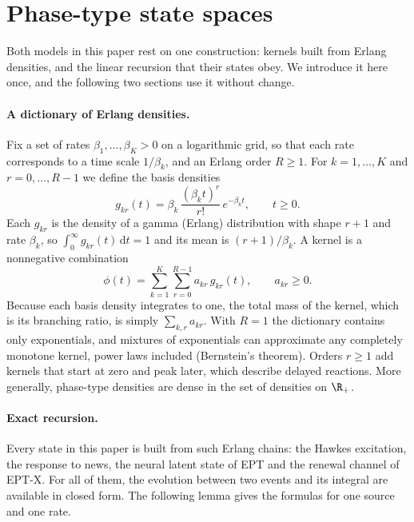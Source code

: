 \section{Phase-type state spaces}\label{sec:phasetype}

Both models in this paper rest on one construction: kernels built from Erlang densities, and the
linear recursion that their states obey. We introduce it here once, and the following two sections
use it without change.

\paragraph{A dictionary of Erlang densities.} Fix a set of rates $\beta_1,\dots,\beta_K>0$ on a
logarithmic grid, so that each rate corresponds to a time scale $1/\beta_k$, and an Erlang order
$R\ge1$. For $k=1,\dots,K$ and $r=0,\dots,R-1$ we define the basis densities
\begin{equation}\label{eq:basis}
g_{kr}(t)=\beta_k\,\frac{(\beta_k t)^r}{r!}\,e^{-\beta_k t},\qquad t\ge0 .
\end{equation}
Each $g_{kr}$ is the density of a gamma (Erlang) distribution with shape $r+1$ and rate
$\beta_k$, so $\int_0^\infty g_{kr}(t)\,\mathrm{d}t=1$ and its mean is $(r+1)/\beta_k$. A kernel is a
nonnegative combination
\begin{equation}\label{eq:kernel}
\phi(t)=\sum_{k=1}^{K}\sum_{r=0}^{R-1}a_{kr}\,g_{kr}(t),\qquad a_{kr}\ge0 .
\end{equation}
Because each basis density integrates to one, the total mass of the kernel, which is its
branching ratio, is simply $\sum_{k,r}a_{kr}$. With $R=1$ the dictionary contains only
exponentials, and mixtures of exponentials can approximate any completely monotone kernel,
power laws included (Bernstein's theorem). Orders $r\ge1$ add kernels that start at zero and peak
later, which describe delayed reactions. More generally, phase-type densities are dense in the set
of densities on $\R_+$.

\paragraph{Exact recursion.} Every state in this paper is built from such Erlang chains: the
Hawkes excitation, the response to news, the neural latent state of EPT and the renewal channel of
EPT-X. For all of them, the evolution between two events and its integral are available in closed
form. The following lemma gives the formulas for one source and one rate.

